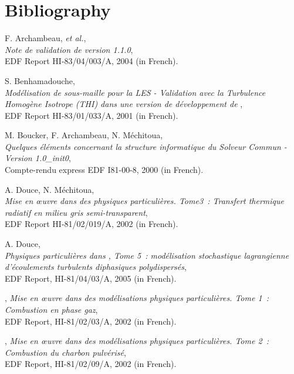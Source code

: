 \section*{Bibliography}
\begin{thebibliography}{3}

 {\sc F. Archambeau, {\em et al.}},\\
{\em Note de validation de \CS version 1.1.0},\\
EDF Report HI-83/04/003/A, 2004 (in French).

 {\sc S. Benhamadouche},\\
{\em Modélisation de sous-maille pour la LES - Validation avec la Turbulence
Homogène Isotrope (THI) dans une version de développement de \CS},\\
EDF Report HI-83/01/033/A, 2001 (in French).

 {\sc M. Boucker, F. Archambeau, N. Méchitoua},\\
{\em Quelques éléments concernant la structure informatique du Solveur Commun -
Version 1.0\_init0},\\
Compte-rendu express EDF I81-00-8, 2000 (in French).

 {\sc A. Douce, \sc N. Méchitoua},\\
{\em Mise en {\oe}uvre dans \CS des physiques particulières. Tome3~:
Transfert thermique radiatif en milieu gris semi-transparent},\\
EDF Report HI-81/02/019/A, 2002 (in French).

 {\sc A. Douce},\\
{\em Physiques particulières dans ,  Tome 5~: modélisation
stochastique lagrangienne d'écoulements turbulents diphasiques polydispersés},\\
EDF Report, HI-81/04/03/A, 2005 (in French).

,
{\em Mise en {\oe}uvre dans \CS des modélisations physiques
particulières.  Tome 1~: Combustion en phase gaz}, \\
EDF Report, HI-81/02/03/A, 2002 (in French).

,
{\em Mise en {\oe}uvre dans \CS des modélisations physiques
particulières.  Tome 2~: Combustion du charbon pulvérisé}, \\
EDF Report, HI-81/02/09/A, 2002 (in French).


\end{thebibliography}
